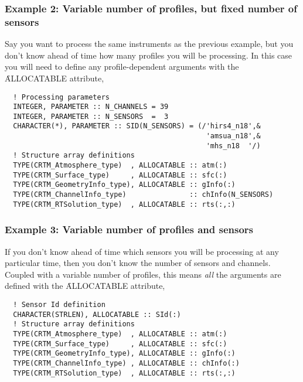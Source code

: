 \subsubsection{Example 2: Variable number of profiles, but fixed number of sensors}
\label{sec:quick_start_step2_ex2}
Say you want to process the same instruments as the previous example, but you don't know ahead of time how many profiles you will be processing. In this case you will need to define any profile-dependent arguments with the \f{ALLOCATABLE} attribute,
\begin{ttfamily}
  \begin{verbatim}
  ! Processing parameters
  INTEGER, PARAMETER :: N_CHANNELS = 39
  INTEGER, PARAMETER :: N_SENSORS  =  3
  CHARACTER(*), PARAMETER :: SID(N_SENSORS) = (/'hirs4_n18',&
                                                'amsua_n18',&
                                                'mhs_n18  '/)
  ! Structure array definitions
  TYPE(CRTM_Atmosphere_type)  , ALLOCATABLE :: atm(:)
  TYPE(CRTM_Surface_type)     , ALLOCATABLE :: sfc(:)
  TYPE(CRTM_GeometryInfo_type), ALLOCATABLE :: gInfo(:)  
  TYPE(CRTM_ChannelInfo_type)               :: chInfo(N_SENSORS)
  TYPE(CRTM_RTSolution_type)  , ALLOCATABLE :: rts(:,:)\end{verbatim}
\end{ttfamily}


\subsubsection{Example 3: Variable number of profiles and sensors}
\label{sec:quick_start_step2_ex3}
If you don't know ahead of time which sensors you will be processing at any particular time, then you don't know the number of sensors and channels. Coupled with a variable number of profiles, this means \textit{all} the arguments are defined with the \f{ALLOCATABLE} attribute,
\begin{ttfamily}
  \begin{verbatim}
  ! Sensor Id definition
  CHARACTER(STRLEN), ALLOCATABLE :: SId(:)
  ! Structure array definitions
  TYPE(CRTM_Atmosphere_type)  , ALLOCATABLE :: atm(:)
  TYPE(CRTM_Surface_type)     , ALLOCATABLE :: sfc(:)
  TYPE(CRTM_GeometryInfo_type), ALLOCATABLE :: gInfo(:)  
  TYPE(CRTM_ChannelInfo_type) , ALLOCATABLE :: chInfo(:)
  TYPE(CRTM_RTSolution_type)  , ALLOCATABLE :: rts(:,:)\end{verbatim}
\end{ttfamily}


